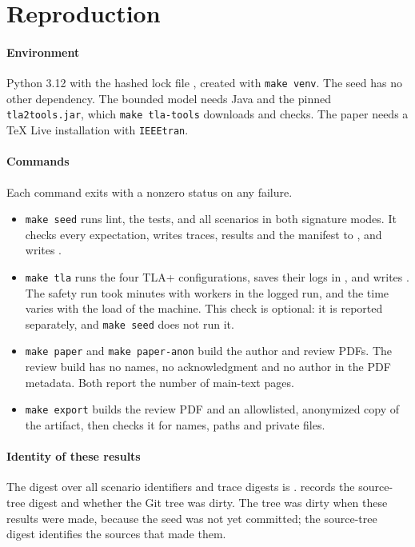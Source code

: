 \section{Reproduction}
\label{app:repro}

\paragraph{Environment}
Python 3.12 with the hashed lock file , created with
\texttt{make venv}. The seed has no other dependency. The bounded model needs Java and the
pinned \texttt{tla2tools.jar}, which \texttt{make tla-tools} downloads and checks. The paper
needs a TeX Live installation with \texttt{IEEEtran}.

\paragraph{Commands}
Each command exits with a nonzero status on any failure.
\begin{itemize}
  \item \texttt{make seed} runs lint, the tests, and all \SeedScenarioCount{} scenarios
  in both signature modes. It checks every expectation, writes traces, results and the
  manifest to , and writes .
  \item \texttt{make tla} runs the four TLA+ configurations, saves their logs in
  , and writes . The safety run
  took \TlaMinutes{} minutes with \TlaWorkers{} workers in the logged run, and the time
  varies with the load of the machine. This check is optional: it is reported separately,
  and \texttt{make seed} does not run it.
  \item \texttt{make paper} and \texttt{make paper-anon} build the author and review PDFs.
  The review build has no names, no acknowledgment and no author in the PDF metadata. Both
  report the number of main-text pages.
  \item \texttt{make export} builds the review PDF and an allowlisted, anonymized copy of
  the artifact, then checks it for names, paths and private files.
\end{itemize}

\paragraph{Identity of these results}
The digest over all scenario identifiers and trace digests is \texttt{\SeedResultsDigest}.
 records the source-tree digest and whether the
Git tree was dirty. The tree was dirty when these results were made, because the seed
was not yet committed; the source-tree digest identifies the sources that made them.

